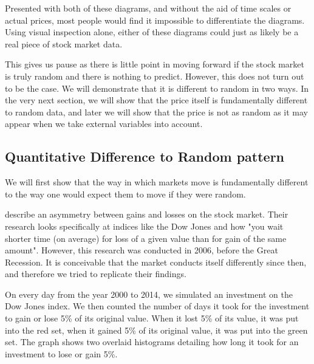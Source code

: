 \documentclass{report}
\begin{document}
Presented with both of these diagrams, and without the aid of time scales or actual prices, most people would find it impossible to differentiate the diagrams. Using visual inspection alone, either of these diagrams could just as likely be a real piece of stock market data.

This gives us pause as there is little point in moving forward if the stock market is truly random and there is nothing to predict. However, this does not turn out to be the case. We will demonstrate that it is different to random in two ways. In the very next section, we will show that the price itself is fundamentally different to random data, and later we will show that the price is not as random as it may appear when we take external variables into account.

\subsection{Quantitative Difference to Random pattern}

We will first show that the way in which markets move is fundamentally different to the way one would expect them to move if they were random.

\citet{karpio2007gain} describe an asymmetry between gains and losses on the stock market. Their research looks specifically at indices like the Dow Jones and how "you wait shorter time (on average) for loss of a given value than for gain of the same amount". However, this research was conducted in 2006, before the Great Recession. It is conceivable that the market conducts itself differently since then, and therefore we tried to replicate their findings.

On every day from the year 2000 to 2014, we simulated an investment on the Dow Jones index. We then counted the number of days it took for the investment to gain or lose 5\% of its original value. When it lost 5\% of its value, it was put into the red set, when it gained 5\% of its original value, it was put into the green set. The graph shows two overlaid histograms detailing how long it took for an investment to lose or gain 5\%.
\end{document}
